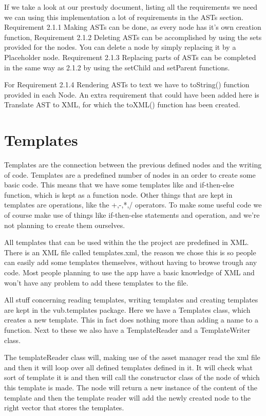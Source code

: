\documentclass[a4paper,12pt]{report}
\begin{document}
If we take a look at our prestudy document, listing all the requirements we need we can using this implementation a lot of requirements in the ASTs section.
Requirement 2.1.1 Making ASTs can be done, as every node has it's own creation function, Requirement 2.1.2 Deleting ASTs can be accomplished by using the sets provided for the nodes. You can delete a node by
simply replacing it by a Placeholder node. Requirement 2.1.3 Replacing parts of ASTs can be completed in the same way as 2.1.2 by using the setChild and setParent functions.

For Requirement 2.1.4 Rendering ASTs to text we have to toString() function provided in each Node. An extra requirement that could have been added here is Translate AST to XML, for which the toXML() function has been created.


\section{Templates} 
Templates are the connection between the previous defined nodes and the writing of code. Templates are a predefined number of nodes in an order to create some basic code. This means that we have some templates like 
and if-then-else function, which is kept as a function node. Other things that are kept in templates are operations, like the +,-,*,/ operators. To make some useful code we of course make use of things like if-then-else
statements and operation, and we're not planning to create them ourselves. 

All templates that can be used within the the project are predefined in XML. There is an XML file called templates.xml, the reason we chose this is so people can easily add some templates themselves, without having 
to browse trough any code. Most people planning to use the app have a basic knowledge of XML and won't have any problem to add these templates to the file.

All stuff concerning reading templates, writing templates and creating templates are kept in the vub.templates package. Here we have a Templates class, which creates a new template. This in fact does nothing more than adding
a name to a function. Next to these we also have a TemplateReader and a TemplateWriter class.

The templateReader class will, making use of the asset manager read the xml file and then it will loop over all defined templates defined in it. It will check what sort of template it is and then will call the
constructor class of the node of which this template is made. The node will return a new instance of the content of the template and then the template reader will add the newly created node to the right vector that
stores the templates.
\end{document}
